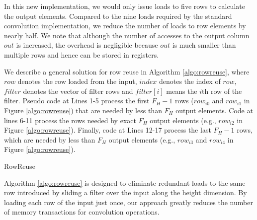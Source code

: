 In this new implementation, we would only issue loads to five rows to calculate the output elements. Compared to the nine loads required by
the standard convolution implementation, we reduce the number of loads to row elements by nearly half.  We note that although the number of
accesses to the output column $out$ is increased, the overhead is negligible because $out$ is much smaller than multiple rows and hence can
be stored in registers.

We describe a general solution for row reuse in Algorithm \ref{algo:rowreuse}, where $row$ denotes the row loaded from the input, $index$
denotes the index of $row$, $filter$ denotes the vector of filter rows and $filter[i]$ means the $i$th row of the filter. Pseudo code at
Lines 1-5 process the first $F_H-1$ rows ($row_{i0}$ and $row_{i1}$ in Figure \ref{algo:rowreuse}) that are needed by less
than $F_H$ output elements. Code at lines 6-11 process the rows needed by exact $F_H$ output elements (e.g., $row_{i2}$ in Figure
\ref{algo:rowreuse}). Finally, code at Lines 12-17 process the last $F_H-1$ rows, which are needed by less than $F_H$ output elements
(e.g., $row_{i3}$ and $row_{i4}$ in Figure \ref{algo:rowreuse}).


\begin{algorithm}[t!]
\small
	\caption{RowReuse}
	\label{algo:rowreuse}
\end{algorithm}

Algorithm \ref{algo:rowreuse} is designed to eliminate redundant loads to the same row introduced by sliding a filter over the input along
the height dimension. By loading each row of the input just once, our approach greatly reduces the number of memory transactions for
convolution operations.
